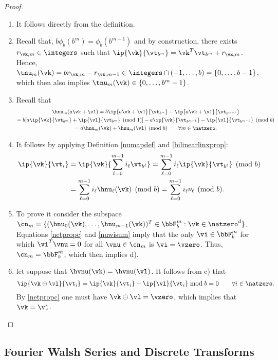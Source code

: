 \documentclass[]{elsarticle}
\theoremstyle{definition}
\renewcommand{\bbK}{\natzero^d}
\begin{document}
\begin{proof}
\begin{enumerate}
\renewcommand{\labelenumi}{\alph{enumi})}
\item It follows directly from the definition.
\item Recall that, $b\phi_b(b^m)=\phi_b(b^{m-1})$ and by construction, there exists $r_{\vk,m}\in\integers$ such that $\ip{\vk}{\vt_{b^m}}=\vk^T\vt_{b^m}+r_{\vk,m}$. Hence, $\tnu_m(\vk)=br_{\vk,m}-r_{\vk,m-1}\in\integers\cap(-1,\dots,b)=\{0,\dots,b-1\}$, which then also implies $\tnu_m(\vk)\in\{0,\dots,b^m-1\}$.
\item Recall that 
\begin{multline*}
\hnu_m(a\vk + \vl)= b\ip{a\vk + \vl}{\vt_{b^m}}-\ip{a\vk + \vl}{\vt_{b^{m-1}}} \\
 = b[a\ip{\vk}{\vt_{b^m}}+\ip{\vl}{\vt_{b^m}} \pmod 1] - a\ip{\vk}{\vt_{b^{m-1}}}-\ip{\vl}{\vt_{b^{m-1}}} \pmod b \\
= a\hnu_m(\vk) + \hnu_m(\vl) \pmod b \qquad \forall m \in \natzero.
\end{multline*}
\item It follows by applying  Definition \ref{numapdef} and \eqref{bilinearlinxprop}:
\begin{align*}
\ip{\vk}{\vt_i} &= \ip{\vk}{\sum_{\ell=0}^{m-1} i_\ell \vt_{b^{\ell}}} = \sum_{\ell=0}^{m-1} i_\ell \ip{\vk}{\vt_{b^{\ell}}} \pmod b \\
& = \sum_{\ell=0}^{m-1} i_\ell \hnu_\ell(\vk) \pmod b = \sum_{\ell=0}^{m-1} i_\ell \nu_\ell \pmod b.
\end{align*}

\item To prove it consider the subspace
$\cn_m = \{(\hnu_0(\vk), \ldots,  \hnu_{m-1}(\vk))^T \in \bbF_b^m : \vk \in \bbK\}$.
Equations \eqref{netpropc} and \eqref{nuwisum} imply that the only $\vi \in \bbF_b^m$ for which $\vi^T\vnu=0$ for all $\vnu \in \cn_m$ is $\vi=\vzero$.  Thus, $\cn_m=\bbF_b^m$, which then implies d).

\item let suppose that $\hvnu(\vk)=\hvnu(\vl)$.  It follows from c) that
\[
\ip{\vk\ominus\vl}{\vt_i} = \ip{\vk}{\vt_i} - \ip{\vl}{\vt_i} \bmod b = 0 \qquad \forall i\in \natzero.
\]
By \eqref{netpropc} one must have $\vk\ominus\vl=\vzero$, which implies that $\vk=\vl$.
\end{enumerate}
\end{proof}

\subsection{Fourier Walsh Series and Discrete Transforms}
\end{document}
